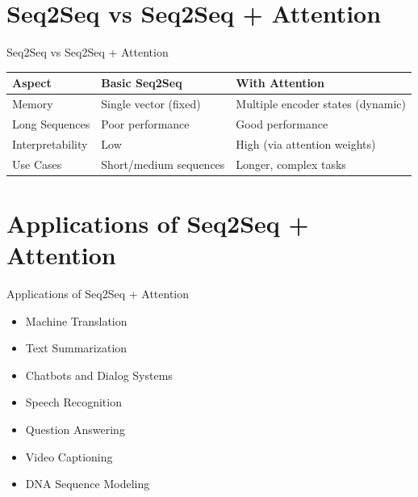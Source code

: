 \section{Seq2Seq vs Seq2Seq + Attention}
\begin{frame}{Seq2Seq vs Seq2Seq + Attention}
    \begin{table}[]
        \centering
        \begin{tabular}{|l|l|l|}
            \hline
            \textbf{Aspect} & \textbf{Basic Seq2Seq} & \textbf{With Attention} \\
            \hline
            Memory & Single vector (fixed) & Multiple encoder states (dynamic) \\
            \hline
            Long Sequences & Poor performance & Good performance \\
            \hline
            Interpretability & Low & High (via attention weights) \\
            \hline
            Use Cases & Short/medium sequences & Longer, complex tasks \\
            \hline
        \end{tabular}
    \end{table}
\end{frame}


\section{Applications of Seq2Seq + Attention}
\begin{frame}{Applications of Seq2Seq + Attention}
    \begin{itemize}
        \setlength{\itemsep}{1em}
        \item Machine Translation
        \item Text Summarization
        \item Chatbots and Dialog Systems
        \item Speech Recognition
        \item Question Answering
        \item Video Captioning
        \item DNA Sequence Modeling
    \end{itemize}
\end{frame}
